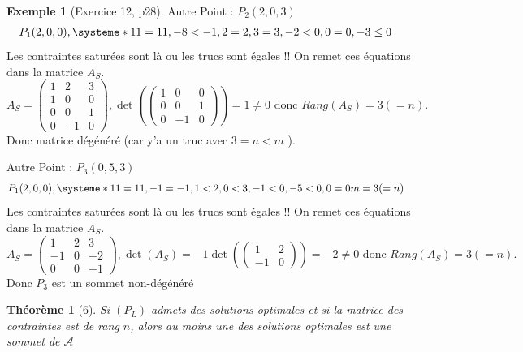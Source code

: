 \documentclass{article}
\theoremstyle{plain}%
\newtheorem{thm}{Théorème}[section]
\theoremstyle{definition}
\newtheorem{exmp}{Exemple}[section]
\theoremstyle{remark}
\begin{document}
\begin{exmp}[Exercice 12, p28]
    Autre Point : $ P_2(2,0,3) $ 
    \begin{align*}
        &P_1(2,0,0), \systeme*{
            11 = 11,
            -8 < -1,
            2 = 2,
            3 = 3,
            -2 < 0,
            0=0,
            -3 \leq 0
        }
    \end{align*}
    Les contraintes saturées sont là ou les trucs sont égales !! On remet ces équations dans la matrice $ A_S $. 
    \[
        A_S = \begin{pmatrix}
            1 & 2 & 3 \\
            1 & 0 & 0 \\
            0 & 0 & 1 \\
            0 & -1 & 0
        \end{pmatrix}
        , \det (\begin{pmatrix}
            1 & 0 & 0 \\
            0 & 0 & 1 \\
            0 & -1 & 0
        \end{pmatrix}
        ) = 1 \neq 0 \text{ donc } Rang(A_S) = 3 (=n)
    .\]
    Donc matrice dégénéré (car y'a un truc avec $ 3 = n < m $ ).

    Autre Point : $ P_3(0,5,3) $ 
    \begin{align*}
        &P_1(2,0,0), \systeme*{
            11 = 11,
            -1 = -1,
            1 < 2,
            0 < 3,
            -1 < 0,
            -5 < 0,
            0 = 0
        } m=3(=n)
    \end{align*}
    Les contraintes saturées sont là ou les trucs sont égales !! On remet ces équations dans la matrice $ A_S $. 
    \[
        A_S = \begin{pmatrix}
            1 & 2 & 3 \\
            -1 & 0 & -2 \\
            0 & 0 & -1
        \end{pmatrix}
        , \det (A_S) = -1 \det (\begin{pmatrix}1 & 2 \\ -1 & 0\end{pmatrix}) = -2 \neq 0 \text{ donc } Rang(A_S) = 3 (=n)
    .\]
    Donc $ P_3 $ est un sommet non-dégénéré
\end{exmp}

\begin{thm}[6]
    Si $ (P_L) $ admets des solutions optimales et si la matrice des contraintes est de rang $ n $, alors au moins une des solutions optimales est une sommet de $ \mathcal{A} $ 
\end{thm}
\end{document}
